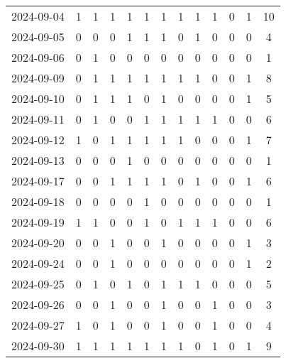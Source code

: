 \documentclass[dvipdfmx,oneside]{article}
\begin{document}
\begin{longtable}{lcccccccccccc}
        2024-09-04 &     1 &     1 &     1 &     1 &     1 &     1 &     1 &     1 &     1 &     0 &     1 &     10 \\
        2024-09-05 &     0 &     0 &     0 &     1 &     1 &     1 &     0 &     1 &     0 &     0 &     0 &      4 \\
        2024-09-06 &     0 &     1 &     0 &     0 &     0 &     0 &     0 &     0 &     0 &     0 &     0 &      1 \\
        2024-09-09 &     0 &     1 &     1 &     1 &     1 &     1 &     1 &     1 &     0 &     0 &     1 &      8 \\
        2024-09-10 &     0 &     1 &     1 &     1 &     0 &     1 &     0 &     0 &     0 &     0 &     1 &      5 \\
        2024-09-11 &     0 &     1 &     0 &     0 &     1 &     1 &     1 &     1 &     1 &     0 &     0 &      6 \\
        2024-09-12 &     1 &     0 &     1 &     1 &     1 &     1 &     1 &     0 &     0 &     0 &     1 &      7 \\
        2024-09-13 &     0 &     0 &     0 &     1 &     0 &     0 &     0 &     0 &     0 &     0 &     0 &      1 \\
        2024-09-17 &     0 &     0 &     1 &     1 &     1 &     1 &     0 &     1 &     0 &     0 &     1 &      6 \\
        2024-09-18 &     0 &     0 &     0 &     0 &     1 &     0 &     0 &     0 &     0 &     0 &     0 &      1 \\
        2024-09-19 &     1 &     1 &     0 &     0 &     1 &     0 &     1 &     1 &     1 &     0 &     0 &      6 \\
        2024-09-20 &     0 &     0 &     1 &     0 &     0 &     1 &     0 &     0 &     0 &     0 &     1 &      3 \\
        2024-09-24 &     0 &     0 &     1 &     0 &     0 &     0 &     0 &     0 &     0 &     0 &     1 &      2 \\
        2024-09-25 &     0 &     1 &     0 &     1 &     0 &     1 &     1 &     1 &     0 &     0 &     0 &      5 \\
        2024-09-26 &     0 &     0 &     1 &     0 &     0 &     1 &     0 &     0 &     1 &     0 &     0 &      3 \\
        2024-09-27 &     1 &     0 &     1 &     0 &     0 &     1 &     0 &     0 &     1 &     0 &     0 &      4 \\
        2024-09-30 &     1 &     1 &     1 &     1 &     1 &     1 &     1 &     0 &     1 &     0 &     1 &      9 \\

\end{longtable}
\end{document}
